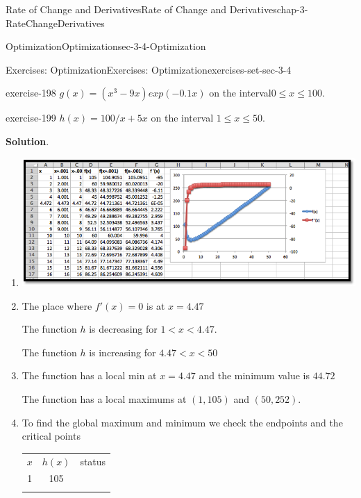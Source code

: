 \documentclass[oneside,10pt,]{book}
\numberwithin{equation}{section}
\newcommand{\hrulethin}  {\noalign{\hrule height 0.04em}}
\newcommand{\hrulethick} {\noalign{\hrule height 0.11em}}
\newcommand{\lt}{<}
\begin{document}
\begin{chapterptx}{Rate of Change and Derivatives}{}{Rate of Change and Derivatives}{}{}{chap-3-RateChangeDerivatives}
\begin{sectionptx}{Optimization}{}{Optimization}{}{}{sec-3-4-Optimization}
\begin{exercises-subsection-numberless}{Exercises: Optimization}{}{Exercises: Optimization}{}{}{exercises-set-sec-3-4}
\begin{exercisegroup}
\begin{divisionexerciseeg}{8}{}{}{exercise-198}
\hypertarget{p-1286}{}%
\(g(x)=(x^3-9 x)exp(-0.1 x)\) on the interval\(0\le x\le 100\).%
\end{divisionexerciseeg}%
\begin{divisionexerciseeg}{9}{}{}{exercise-199}%
\hypertarget{p-1287}{}%
\(h(x)=100/x+5 x\) on the interval \(1\le x\le 50\).%
\par\smallskip%
\noindent\textbf{Solution}.\hypertarget{solution-99}{}\quad%
\leavevmode%
\begin{enumerate}[label=(\alph*)]
\item\hypertarget{li-408}{}\leavevmode%
\begin{sidebyside}{1}{0.1}{0.1}{0}%
\begin{sbspanel}{0.8}%
\includegraphics[width=1\linewidth]{images/sec3-4-sol9a.png}
\end{sbspanel}%
\end{sidebyside}%
%
\item\hypertarget{li-409}{}\hypertarget{p-1288}{}%
The place where \(f'(x)=0\) is at \(x = 4.47\)%
\par
\hypertarget{p-1289}{}%
The function \(h\) is decreasing for \(1\lt x \lt 4.47\).%
\par
\hypertarget{p-1290}{}%
The function \(h\) is increasing for \(4.47 \lt x\lt 50\)%
\item\hypertarget{li-410}{}\hypertarget{p-1291}{}%
The function has a local min at \(x = 4.47\) and the minimum value is \(44.72\)%
\par
\hypertarget{p-1292}{}%
The function has a local maximums at \((1, 105)\) and \((50, 252)\).%
\item\hypertarget{li-411}{}\hypertarget{p-1293}{}%
To find the global maximum and minimum we check the endpoints and the critical points%
\begin{sidebyside}{1}{0}{0}{0}%
\begin{sbspanel}{1}%
{\centering%
\begin{tabular}{ccc}\hrulethick
\(x\)&\(h(x)\)&status\tabularnewline\hrulethin
1&105&\tabularnewline\hrulethin

\end{tabular}}
\end{sbspanel}
\end{sidebyside}
\end{enumerate}
\end{divisionexerciseeg}
\end{exercisegroup}
\end{exercises-subsection-numberless}
\end{sectionptx}
\end{chapterptx}
\end{document}
